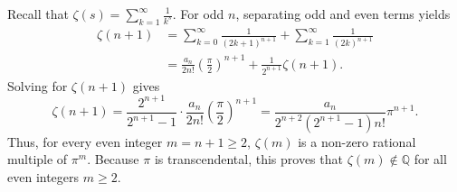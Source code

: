 \begin{remark}
    Recall that \(\zeta(s) = \sum_{k=1}^{\infty} \frac{1}{k^s}\).
    For odd \(n\), separating odd and even terms yields
    \begin{align*}
        \zeta(n+1) &= \sum_{k=0}^{\infty} \frac{1}{(2k+1)^{n+1}} + \sum_{k=1}^{\infty} \frac{1}{(2k)^{n+1}} \\
        &= \frac{a_n}{2 n!} \left( \frac{\pi}{2} \right)^{n+1} + \frac{1}{2^{n+1}} \zeta(n+1).
    \end{align*}
    Solving for \(\zeta(n+1)\) gives
    \[
        \zeta(n+1) = \frac{2^{n+1}}{2^{n+1} - 1} \cdot \frac{a_n}{2 n!} \left( \frac{\pi}{2} \right)^{n+1} = \frac{a_n}{2^{n+2}(2^{n+1} - 1) n!} \pi^{n+1}.
    \]
    Thus, for every even integer \(m = n+1 \ge 2\), \(\zeta(m)\) is a non-zero rational multiple of \(\pi^m\).
    Because \(\pi\) is transcendental, this proves that \(\zeta(m) \notin \mathbb{Q}\) for all even integers \(m \ge 2\).
\end{remark}
